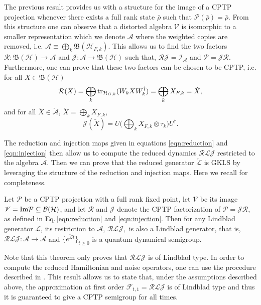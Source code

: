 \documentclass[twocolumn]{autart}    %
\newcommand{\Fc}{\mathcal{F}}
\newcommand{\Hc}{\mathcal{H}}
\newcommand{\Ic}{\mathcal{I}}
\newcommand{\Jc}{\mathcal{J}}
\newcommand{\Lc}{\mathcal{L}}
\newcommand{\Pc}{\mathcal{P}}
\newcommand{\Rc}{\mathcal{R}}
\newcommand{\As}{\mathscr{A}}
\newcommand{\Vs}{\mathscr{V}}
\newcommand{\Bf}{\mathfrak{B}}
\newcommand{\es}{\mathcal{J}}
\newcommand{\tr}{{\rm tr}}
\begin{document}
The previous result provides us with a structure for the image of a  CPTP projection whenever there exists a full rank state $\bar{\rho}$ such that $\Pc(\bar{\rho}) = \bar{\rho}$. From this structure one can observe that a distorted algebra $\Vs$ is isomorphic to a smaller representation which we denote $\As$ where the weighted copies are removed, i.e. $\As \equiv \bigoplus_k \Bf(\Hc_{F,k})$. This allows us to find the two factors $\Rc:\Bf(\Hc)\to{\As}$ and $\Jc:{\As}\to\Bf(\Hc)$ such that, $\Rc\Jc = \Ic_{{\As}}$ and $\Pc = \Jc\Rc$. 
Furthermore, one can prove \cite{grigoletto2024exact} that these two factors can be chosen to be CPTP, i.e. for all $X\in\Bf(\Hc)$
\begin{equation}
\label{eqn:reduction}
\Rc(X)=\bigoplus_k \tr_{\Hc_{G,k}}(W_k X W_k^\dag)=\bigoplus_k X_{F,k}=\check X ,
\end{equation}
and for all $\check{X}\in\check{\As}$, $\check{X}=\bigoplus_k X_{F,k}$,
\begin{equation}
\label{eqn:injection}
\es(\check X)=U\bigg(\bigoplus_k X_{F,k} \otimes\tau_{k}\bigg)U^\dag.
\end{equation}

The reduction and injection maps given in equations \eqref{eqn:reduction} and \eqref{eqn:injection} then allow us to compute the reduced dynamics $ \Rc\Lc\Jc$ restricted to the algebra ${\As}$. Then we can prove that the reduced generator $\check{\Lc}$ is GKLS by leveraging the structure of the reduction and injection maps. Here we recall \cite[Theorem 4]{grigoletto2024exact} for completeness.
\begin{thm}
\label{thm:Lindblad_reduction}
Let $\Pc$ be a CPTP projection with a full rank fixed point, let $\mathscr{V}$ be its image $\Vs = {\rm Im }\Pc \subseteq \mathcal{B(H)}$, and let $\Rc$ and $\Jc$ denote the CPTP factorization of $\Pc = \Jc\Rc$, as defined in Eq.\,\eqref{eqn:reduction} and \eqref{eqn:injection}. Then for any Lindblad generator $\Lc$, its restriction to ${\As}$, 
$\Rc\Lc\Jc,$ 
is also a Lindblad generator, that is, $\Rc\Lc\Jc:\As\to\As$ and $\{e^{\check{\Lc}t}\}_{t\geq 0}$ is a quantum dynamical semigroup. 
\end{thm}
Note that this theorem only proves that $\Rc\Lc\Jc$ is of Lindblad type. In order to compute the reduced Hamiltonian and noise operators, one can use the procedure described in \cite[Appendix]{grigoletto2025quantummodelreductioncontinuoustime}.
This result allows us to state that, under the assumptions described above, the approximation at first order $\Fc_{t,1} = \Rc\Lc\Jc$ is of Lindblad type and thus it is guaranteed to give a CPTP semigroup for all times.    
\end{document}
